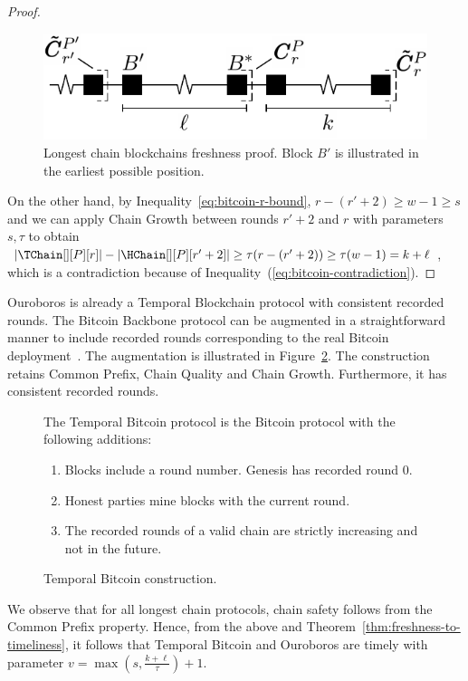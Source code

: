 \begin{proof}
  \begin{figure}
    \centering
    \includegraphics[width=0.5\columnwidth,keepaspectratio]{figures/longest-chain-proof.pdf}
    \caption{Longest chain blockchains freshness proof. Block $B'$ is illustrated in the
             earliest possible position.
    }
   \label{fig:longest-chain-freshness-proof}
  \end{figure}

  On the other hand, by Inequality~\ref{eq:bitcoin-r-bound}, $r - (r' + 2) \geq w - 1 \geq s$ and
  we can apply Chain Growth between rounds $r' + 2$ and $r$
  with parameters $s, \tau$ to obtain
  $|\TChain[][P][r]| - |\HChain[][P][r' + 2]| \geq \tau(r - (r' + 2)) \geq \tau (w - 1) =  k + \ell$,
  which is a contradiction because of Inequality~(\ref{eq:bitcoin-contradiction}).
  \Qed
\end{proof}

Ouroboros is already a Temporal Blockchain protocol with consistent recorded rounds.
The Bitcoin Backbone protocol can be augmented in a
straightforward manner to include recorded rounds
corresponding to the real Bitcoin deployment~\cite{mastering-bitcoin}.
The augmentation is illustrated in Figure~\ref{fig.temporal-backbone}.
The construction retains Common Prefix, Chain Quality and Chain Growth.
Furthermore, it has consistent recorded rounds.

\begin{figure}
  The Temporal Bitcoin protocol is the Bitcoin protocol with
  the following additions:

  \begin{enumerate}
    \item Blocks include a round number. Genesis has recorded round $0$.
    \item Honest parties mine blocks with the current round.
    \item The recorded rounds of a valid chain are strictly increasing and not in the future.
  \end{enumerate}
  \caption{Temporal Bitcoin construction.}
  \label{fig.temporal-backbone}
\end{figure}

We observe that for all longest chain protocols, chain safety follows from the
Common Prefix property. Hence, from the above and Theorem~\ref{thm:freshness-to-timeliness},
it follows that Temporal Bitcoin and
Ouroboros are timely with parameter $v = \max(s, \frac{k + \ell}{\tau}) + 1$.
